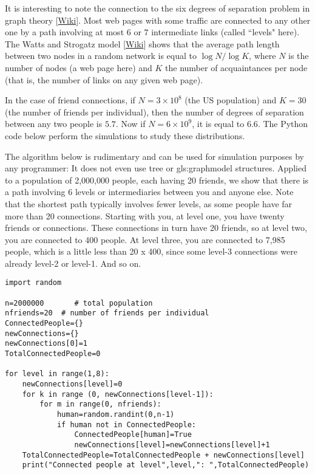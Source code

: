 \documentclass[oneside,10pt]{book}
\begin{document}
It is interesting to note the connection to the \textcolor{index}{six degrees of separation} problem in graph theory [\href{https://en.wikipedia.org/wiki/Six_degrees_of_separation}{Wiki}].  Most web pages with some traffic are connected to any other one by a path involving at most $6$ or $7$ intermediate links (called ``levels" here).
The \textcolor{index}{Watts and Strogatz model} [\href{https://en.wikipedia.org/wiki/Watts\%E2\%80\%93Strogatz_model}{Wiki}] shows that the average path length between two nodes in a random network is equal to $\log N / \log K$, where $N$ is the number of
 nodes (a web page here) and $K$ the number  of acquaintances per node (that is, the number of links on any given web page).

In the case of friend connections, if $N = 3\times 10^8$ (the US population) and $K = 30$ (the number of friends per individual), then  the
number of degrees of separation between any two people is $5.7$. Now if $N = 6\times 10^9$, it is equal to $6.6$. The Python code below perform the simulations to study these distributions.

The algorithm below is rudimentary and can be used for simulation purposes by any programmer: It does not even use tree or \gls{gls:graphmodel} structures.  Applied to a population of 2,000,000 people, each having 20 friends, we show that there is a path involving 6 levels or intermediaries between you and anyone else. Note that the shortest path typically involves fewer levels, as some people have far more than 20 connections.
Starting with you, at level one, you have twenty friends or connections. These connections in turn have 20 friends, so at level two, you are connected to 400 people. At level three, you are connected to 7,985 people, which is a little less than 20 x 400, since some level-3 connections were already level-2 or level-1. And so on. \\


\begin{lstlisting}
import random

n=2000000       # total population
nfriends=20  # number of friends per individual
ConnectedPeople={}
newConnections={}
newConnections[0]=1
TotalConnectedPeople=0

for level in range(1,8):
    newConnections[level]=0
    for k in range (0, newConnections[level-1]):
        for m in range(0, nfriends):
            human=random.randint(0,n-1)
            if human not in ConnectedPeople:
                ConnectedPeople[human]=True
                newConnections[level]=newConnections[level]+1
    TotalConnectedPeople=TotalConnectedPeople + newConnections[level]
    print("Connected people at level",level,": ",TotalConnectedPeople)
\end{lstlisting}
\end{document}

